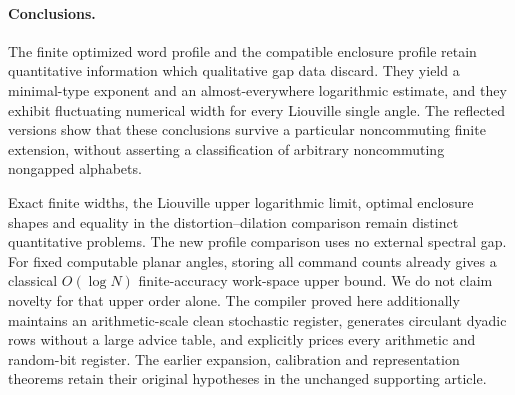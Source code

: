 \paragraph{Conclusions.}
The finite optimized word profile and the compatible enclosure profile retain quantitative information which qualitative gap data discard. They yield a minimal-type exponent and an almost-everywhere logarithmic estimate, and they exhibit fluctuating numerical width for every Liouville single angle. The reflected versions show that these conclusions survive a particular noncommuting finite extension, without asserting a classification of arbitrary noncommuting nongapped alphabets.

Exact finite widths, the Liouville upper logarithmic limit, optimal enclosure shapes and equality in the distortion--dilation comparison remain distinct quantitative problems. The new profile comparison uses no external spectral gap. For fixed computable planar angles, storing all command counts already gives a classical $O(\log N)$ finite-accuracy work-space upper bound. We do not claim novelty for that upper order alone. The compiler proved here additionally maintains an arithmetic-scale clean stochastic register, generates circulant dyadic rows without a large advice table, and explicitly prices every arithmetic and random-bit register. The earlier expansion, calibration and representation theorems retain their original hypotheses in the unchanged supporting article.
